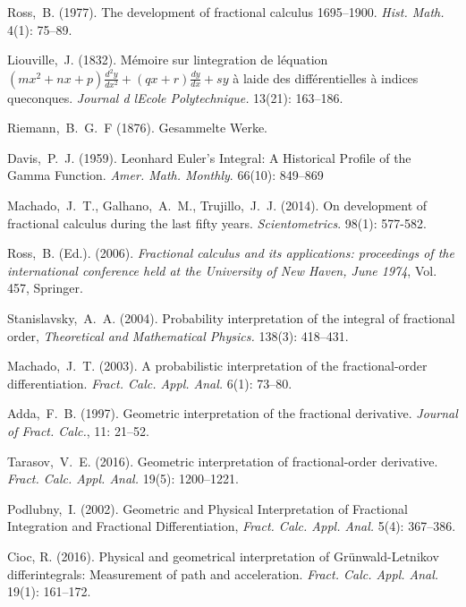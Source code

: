 \documentclass{article}
\theoremstyle{theorem}
\theoremstyle{definition}
\begin{document}
\begin{thebibliography}{1}

 Ross,~B. (1977). The development of fractional calculus 1695--1900. \textit{Hist. Math.} 4(1): 75--89.

 Liouville,~J. (1832). M\'{e}moire sur l\textquotesingle integration de l\textquotesingle \'{e}quation $(mx^2+nx+p)\frac{d^2y}{dx^2}+(qx+r)\frac{dy}{dx}+sy$ \`{a} l\textquotesingle aide des diff\'{e}rentielles \`{a} indices 
que\textquotesingle conques. \textit{Journal d l\textquotesingle Ecole Polytechnique.} 13(21): 163--186. 

 Riemann,~B.~G.~F (1876). Gesammelte Werke.

 Davis,~P.~J. (1959). Leonhard Euler's Integral: A Historical Profile of the Gamma Function. \textit{Amer. Math. Monthly}. 66(10): 849--869

 Machado,~J.~T., Galhano,~A.~M., Trujillo,~J.~J. (2014). On development of fractional calculus during the last fifty years. \textit{Scientometrics}. 98(1): 577-582.

 Ross,~B. (Ed.). (2006). \textit{Fractional calculus and its applications: proceedings of the international conference held at the University of New Haven, June 1974}, Vol. 457, Springer.
 
 Stanislavsky,~A.~A. (2004).  Probability interpretation of the integral of fractional order, \textit{Theoretical and Mathematical Physics.} 138(3): 418--431.

 Machado,~J.~T. (2003). A probabilistic interpretation of the fractional-order differentiation. \textit{Fract. Calc. Appl. Anal.} 6(1): 73--80.

 Adda,~F.~B. (1997). Geometric interpretation of the fractional derivative. \textit{Journal of Fract. Calc.}, 11: 21--52.

 Tarasov,~V.~E. (2016). Geometric interpretation of fractional-order derivative. \textit{Fract. Calc. Appl. Anal.} 19(5): 1200--1221.

 Podlubny,~I. (2002). Geometric and Physical Interpretation of Fractional Integration and Fractional Differentiation, \textit{Fract. Calc. Appl. Anal.} 5(4): 367--386.

 Cioc, R. (2016). Physical and geometrical interpretation of Gr\"{u}nwald-Letnikov differintegrals: Measurement of path and acceleration. \textit{Fract. Calc. Appl. Anal.} 19(1): 161--172.


\end{thebibliography}
\end{document}
